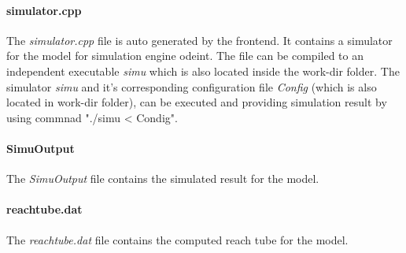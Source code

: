 \documentclass{tufte-book} %
\begin{document}
\paragraph{simulator.cpp}
The \textit{simulator.cpp} file is auto generated by the frontend. It contains a simulator for the model for simulation engine odeint. The file can be compiled to an independent executable \textit{simu} which is also located inside the work-dir folder. The simulator \textit{simu} and it's corresponding configuration file \textit{Config} (which is also located in work-dir folder), can be executed and providing simulation result by using commnad "./simu < Condig".
\paragraph{SimuOutput}
The \textit{SimuOutput} file contains the simulated result for the model. 
\paragraph{reachtube.dat}
The \textit{reachtube.dat} file contains the computed reach tube for the model.

\appendix
\end{document}
